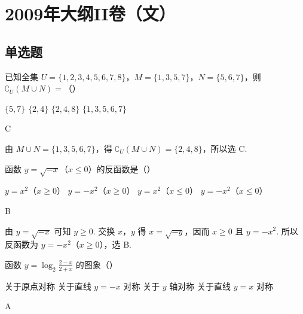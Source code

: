 \chapter{2009年大纲II卷（文）}

\section{单选题}

\begin{problem}
已知全集 \(U = \{1, 2, 3, 4, 5, 6, 7, 8\}\)，\(M = \{1, 3, 5, 7\}\)，\(N = \{5, 6, 7\}\)，则 \(\complement_U(M \cup N) =\)（\quad）

\choices
    {\( \{5, 7\} \)}
    {\(\{2, 4\}\)}
    {\(\{2, 4, 8\}\)}
    {\(\{1,3,5,6,7\}\)}
\end{problem}

\begin{answer}
C
\end{answer}

\begin{solution}
由 \(M\cup N=\{1,3,5,6,7\}\)，得
\(\complement_U(M\cup N)=\{2,4,8\}\)，所以选 C.
\end{solution}

\begin{problem}
函数 \( y = \sqrt{-x} \)（\(x \leqslant 0\)）的反函数是（\quad）

\choices
    {\(y = x^{2}\)（\(x\geqslant 0\)）}
    {\(y = -x^{2}\)（\(x\geqslant 0\)）}
    {\(y = x^{2}\)（\(x\leqslant 0\)）}
    {\(y = -x^{2}\)（\(x\leqslant 0\)）}
\end{problem}

\begin{answer}
B
\end{answer}

\begin{solution}
由 \(y=\sqrt{-x}\) 可知 \(y\geqslant0\). 交换 \(x\)，\(y\) 得 \(x=\sqrt{-y}\)，因而 \(x\geqslant0\) 且 \(y=-x^2\). 所以反函数为 \(y=-x^2\)（\(x\geqslant0\)），选 B.
\end{solution}

\begin{problem}
函数 \( y = \log_2\frac{2 - x}{2 + x} \) 的图象（\quad）

\choices
    {关于原点对称}
    {关于直线 \( y = -x \) 对称}
    {关于 \(y\) 轴对称}
    {关于直线 \( y = x \) 对称}
\end{problem}

\begin{answer}
A
\end{answer}

